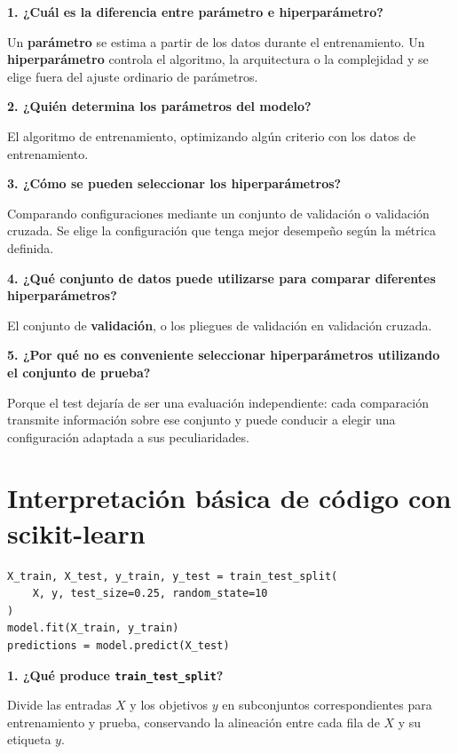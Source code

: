 \documentclass[11pt]{article}
\newcommand{\pregunta}[1]{\vspace{2mm}\textbf{#1}}
\begin{document}
\pregunta{1. ¿Cuál es la diferencia entre parámetro e hiperparámetro?}
\begin{respuesta}
Un \textbf{parámetro} se estima a partir de los datos durante el entrenamiento. Un \textbf{hiperparámetro} controla el algoritmo, la arquitectura o la complejidad y se elige fuera del ajuste ordinario de parámetros.
\end{respuesta}

\pregunta{2. ¿Quién determina los parámetros del modelo?}
\begin{respuesta}
El algoritmo de entrenamiento, optimizando algún criterio con los datos de entrenamiento.
\end{respuesta}

\pregunta{3. ¿Cómo se pueden seleccionar los hiperparámetros?}
\begin{respuesta}
Comparando configuraciones mediante un conjunto de validación o validación cruzada. Se elige la configuración que tenga mejor desempeño según la métrica definida.
\end{respuesta}

\pregunta{4. ¿Qué conjunto de datos puede utilizarse para comparar diferentes hiperparámetros?}
\begin{respuesta}
El conjunto de \textbf{validación}, o los pliegues de validación en validación cruzada.
\end{respuesta}

\pregunta{5. ¿Por qué no es conveniente seleccionar hiperparámetros utilizando el conjunto de prueba?}
\begin{respuesta}
Porque el test dejaría de ser una evaluación independiente: cada comparación transmite información sobre ese conjunto y puede conducir a elegir una configuración adaptada a sus peculiaridades.
\end{respuesta}

\section{Interpretación básica de código con scikit-learn}

\begin{lstlisting}
X_train, X_test, y_train, y_test = train_test_split(
    X, y, test_size=0.25, random_state=10
)
model.fit(X_train, y_train)
predictions = model.predict(X_test)
\end{lstlisting}

\pregunta{1. ¿Qué produce \texttt{train\_test\_split}?}
\begin{respuesta}
Divide las entradas $X$ y los objetivos $y$ en subconjuntos correspondientes para entrenamiento y prueba, conservando la alineación entre cada fila de $X$ y su etiqueta $y$.
\end{respuesta}
\end{document}
